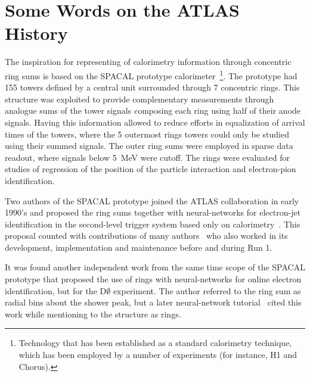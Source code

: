 \section{Some Words on the ATLAS \rnn History}\label{sec:history}

The inspiration for representing of calorimetry information through concentric
ring sums is based on the SPACAL prototype
calorimeter~\cite{1992_spacal_rings}\footnote{Technology that has been
established as a standard calorimetry technique, which has been employed by a
number of experiments (for instance, H1 and Chorus).}.
The prototype had 155 towers defined by a central unit surrounded through 7
concentric rings. This structure was exploited to provide complementary
measurements through analogue sums of the tower signals composing each ring
using half of their anode signals. Having this information allowed to reduce
efforts in equalization of arrival times of the towers, where the 5 outermost
rings towers could only be studied using their summed signals. The outer ring
sums were employed in sparse data readout, where signals below \SI{5}{MeV} were
cutoff. The rings were evaluated for studies of regression of the position of
the particle interaction and electron-pion identification.

Two authors of the SPACAL prototype joined the ATLAS collaboration in early
1990's and proposed the ring sums together with neural-networks for electron-jet
identification in the second-level trigger system based only on
calorimetry~\cite{1995_seixas_ringer}. This proposal counted with contributions
of many
authors~\cite{1998_anjos_dantas,2003_anjos,2010_torres,2010_simas,2012_ciodaro}
who also worked in its development, implementation and maintenance before and
during Run 1.

It was found another independent work from the same time scope of the SPACAL
prototype that proposed the use of rings with neural-networks for online
electron identification, but for the D$\emptyset$ experiment. The author
referred to the ring sum as radial bins about the shower peak, but a later
neural-network tutorial~\cite{denby1990neural} cited this work while mentioning
to the structure as rings.
